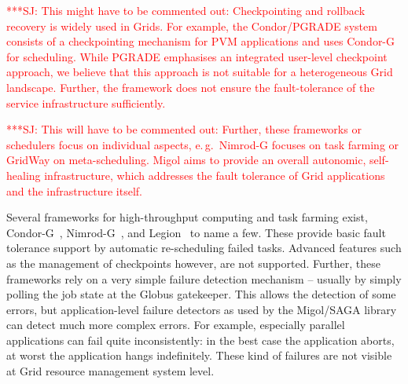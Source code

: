 \documentclass[conference,final]{IEEEtran}
\newcommand{\jhanote}[1]{ {\textcolor{red} { ***SJ: #1 }}}
\newcommand{\jhanote}[1]{}
\newcommand{\up}{\vspace*{-1em}}
\begin{document}
\up
{}

\up
\jhanote{This might have to be commented out: Checkpointing and
  rollback recovery is widely used in Grids. For example, the
  Condor/PGRADE system~\cite{DBLP:conf/eagc/KovacsK04} consists of a
  checkpointing mechanism for PVM applications and uses
  Condor-G~\cite{citeulike:291860} for scheduling.  While PGRADE
  emphasises an integrated user-level checkpoint approach, we believe
  that this approach is not suitable for a heterogeneous Grid
  landscape. Further, the framework does not ensure the
  fault-tolerance of the service infrastructure sufficiently.}
                                 





\jhanote{This will have to be commented out: Further, these frameworks
  or schedulers focus on individual aspects, e.\,g.\ Nimrod-G focuses
  on task farming or GridWay on meta-scheduling. Migol aims to provide
  an overall autonomic, self-healing infrastructure, which addresses
  the fault tolerance of Grid applications and the infrastructure
  itself.}


 Several frameworks for
high-throughput computing and task farming exist,
Condor-G~\cite{citeulike:291860}, Nimrod-G~\cite{buyya00nimrodg}, and
Legion~\cite{689541} to name a few. These provide basic fault
tolerance support by automatic re-scheduling failed tasks. Advanced
features such as the management of checkpoints however, are not
supported. Further, these frameworks rely on a very simple failure
detection mechanism -- usually by simply polling the job state at the
Globus gatekeeper. This allows the detection of some errors, but
application-level failure detectors as used by the Migol/SAGA library
can detect much more complex errors. For example, especially parallel
applications can fail quite inconsistently: in the best case the
application aborts, at worst the application hangs indefinitely. These
kind of failures are not visible at Grid resource management system
level.
\end{document}
